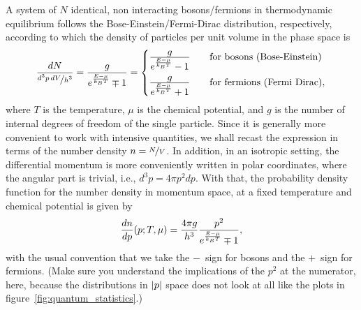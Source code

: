 A system of $N$ identical, non interacting bosons/fermions in thermodynamic equilibrium
follows the Bose-Einstein/Fermi-Dirac distribution, respectively, according to which
the density of particles per unit volume in the phase space is
\begin{align*}
  \frac{dN}{\nicefrac{d^3p\,dV}{h^3}} = \frac{g}{e^\frac{E - \mu}{k_B T} \mp 1} =
  \begin{cases}
    \frac{\displaystyle g}{\displaystyle e^\frac{E - \mu}{k_B T} - 1} &
    \quad\text{for bosons (Bose-Einstein)}\\[12pt]
    \frac{\displaystyle g}{\displaystyle e^\frac{E - \mu}{k_B T} + 1} &
    \quad\text{for fermions (Fermi Dirac)},
  \end{cases}
\end{align*}
where $T$ is the temperature, $\mu$ is the chemical potential, and $g$
is the number of internal degrees of freedom of the single particle. Since it
is generally more convenient to work with intensive quantities, we shall recast
the expression in terms of the number density $n = \nicefrac{N}{V}$. In addition,
in an isotropic setting, the differential momentum is more conveniently written in
polar coordinates, where the angular part is trivial, i.e., $d^3p = 4\pi p^2 dp$.
With that, the probability density function for the number density in momentum space,
at a fixed temperature and chemical potential is given by
\begin{align}\label{eq:qstats}
  \frac{dn}{dp}(p; T, \mu) =
  \frac{4\pi g}{h^3} \frac{p^2}{e^\frac{E - \mu}{k_B T} \mp 1},
\end{align}
with the usual convention that we take the $-$~sign for bosons and the $+$~sign
for fermions. (Make sure you understand the implications of the $p^2$ at the
numerator, here, because the distributions in $\abs{p}$ space does not look at all
like the plots in figure~\ref{fig:quantum_statistics}.)

